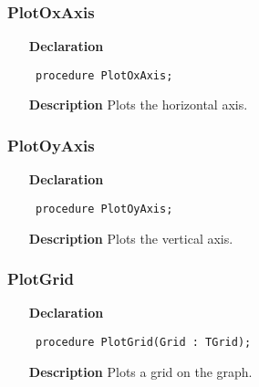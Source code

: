 \documentclass[12pt,a4paper,oneside]{report}
\newcommand{\declarationitem}[1]{\textbf{#1}}
\newcommand{\descriptiontitle}[1]{\textbf{#1}}
\newcommand{\code}[1]{\texttt{#1}}
\begin{document}
\subsubsection{PlotOxAxis}
\label{uplot-PlotOxAxis}
\begin{itemize}\item[\declarationitem{Declaration}\hfill]
	\begin{flushleft}
		\code{
			procedure PlotOxAxis;}
		
	\end{flushleft}
	
	\par
	\item[\descriptiontitle{Description}]
	Plots the horizontal axis.
	
\end{itemize}
\subsubsection{PlotOyAxis}
\label{uplot-PlotOyAxis}
\begin{itemize}\item[\declarationitem{Declaration}\hfill]
	\begin{flushleft}
		\code{
			procedure PlotOyAxis;}
		
	\end{flushleft}
	
	\par
	\item[\descriptiontitle{Description}]
	Plots the vertical axis.
	
\end{itemize}
\subsubsection{PlotGrid}
\label{uplot-PlotGrid}
\begin{itemize}\item[\declarationitem{Declaration}\hfill]
	\begin{flushleft}
		\code{
			procedure PlotGrid(Grid : TGrid);}
		
	\end{flushleft}
	
	\par
	\item[\descriptiontitle{Description}]
	Plots a grid on the graph.
	
\end{itemize}
\end{document}
